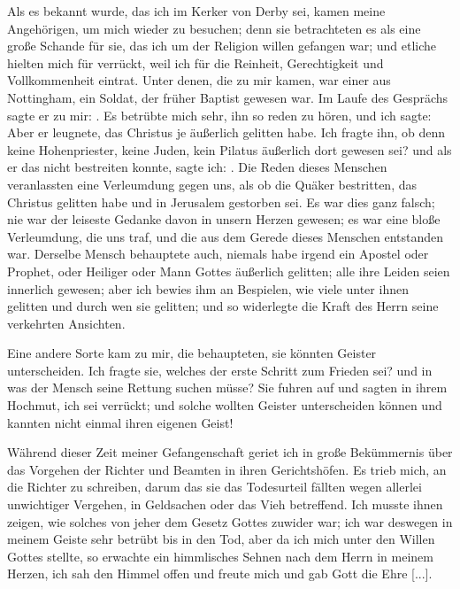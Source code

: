 \medskip 

Als es bekannt wurde, das ich im Kerker von Derby sei, kamen
meine Angehörigen, um mich wieder zu besuchen; 
denn sie betrachteten
es als eine große Schande für sie, das ich um der Religion
willen gefangen war; und etliche hielten mich für verrückt, weil
ich für die Reinheit, Gerechtigkeit 
und Vollkommenheit eintrat.
Unter denen, die zu mir kamen, war einer aus Nottingham,
ein Soldat, der früher Baptist gewesen war. Im Laufe des 
Gesprächs sagte er zu mir: . 
Es betrübte mich sehr, ihn so reden zu hören, und
ich sagte:  Aber er leugnete, das Christus je äußerlich
gelitten habe. Ich fragte ihn, 
ob denn keine Hohenpriester, keine
Juden, kein Pilatus äußerlich dort gewesen sei? und als er das
nicht bestreiten konnte, sagte ich: . Die Reden dieses Menschen veranlassten eine 
Verleumdung gegen uns, als ob die Quäker 
bestritten, das Christus
gelitten habe und in Jerusalem gestorben sei. Es war dies ganz
falsch; nie war der leiseste Gedanke davon in unsern Herzen 
gewesen; es war eine bloße Verleumdung, die uns traf, und die
aus dem Gerede dieses Menschen entstanden war. Derselbe
Mensch behauptete auch, niemals habe irgend ein Apostel oder
Prophet, oder Heiliger oder Mann Gottes äußerlich gelitten; alle
ihre Leiden seien innerlich gewesen; aber ich bewies ihm an 
Bespielen, wie viele unter ihnen gelitten und durch wen sie gelitten;
und so widerlegte die Kraft des Herrn seine verkehrten Ansichten.

\medmuskip

Eine andere Sorte kam zu mir, die behaupteten, sie könnten
Geister unterscheiden. Ich fragte sie, welches der erste Schritt
zum Frieden sei? und in was der Mensch seine Rettung suchen
müsse? Sie fuhren auf und sagten in ihrem Hochmut, ich sei
verrückt; und solche wollten Geister unterscheiden können und
kannten nicht einmal ihren eigenen Geist!

\medmuskip

Während dieser Zeit meiner Gefangenschaft geriet ich in
große Bekümmernis über das Vorgehen der Richter und Beamten
in ihren Gerichtshöfen. Es trieb mich, an die Richter zu schreiben,
darum das sie das Todesurteil fällten wegen allerlei unwichtiger
Vergehen, in Geldsachen oder das 
Vieh betreffend. Ich musste
ihnen zeigen, wie solches von jeher dem Gesetz Gottes zuwider
war; ich war deswegen in meinem Geiste sehr betrübt bis in den
Tod, aber da ich mich unter den Willen Gottes stellte, so 
erwachte ein himmlisches Sehnen nach dem Herrn in meinem Herzen,
ich sah den Himmel offen und freute mich und gab Gott die
Ehre [...].

